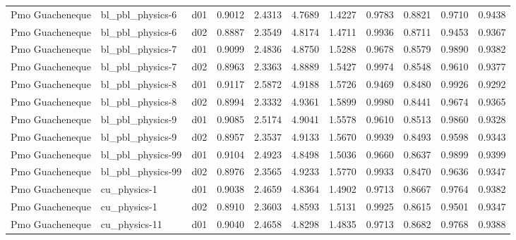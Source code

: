 \begin{longtable}{lllrrrrrrrr}
      Pmo Guacheneque  &      bl\_pbl\_physics-6 &     d01 &   0.9012 &   2.4313 &   4.7689 &       1.4227 &        0.9783 &       0.8821 &           0.9710 &  0.9438 \\
      Pmo Guacheneque  &      bl\_pbl\_physics-6 &     d02 &   0.8887 &   2.3549 &   4.8174 &       1.4711 &        0.9936 &       0.8711 &           0.9453 &  0.9367 \\
      Pmo Guacheneque  &      bl\_pbl\_physics-7 &     d01 &   0.9099 &   2.4836 &   4.8750 &       1.5288 &        0.9678 &       0.8579 &           0.9890 &  0.9382 \\
      Pmo Guacheneque  &      bl\_pbl\_physics-7 &     d02 &   0.8963 &   2.3363 &   4.8889 &       1.5427 &        0.9974 &       0.8548 &           0.9610 &  0.9377 \\
      Pmo Guacheneque  &      bl\_pbl\_physics-8 &     d01 &   0.9117 &   2.5872 &   4.9188 &       1.5726 &        0.9469 &       0.8480 &           0.9926 &  0.9292 \\
      Pmo Guacheneque  &      bl\_pbl\_physics-8 &     d02 &   0.8994 &   2.3332 &   4.9361 &       1.5899 &        0.9980 &       0.8441 &           0.9674 &  0.9365 \\
      Pmo Guacheneque  &      bl\_pbl\_physics-9 &     d01 &   0.9085 &   2.5174 &   4.9041 &       1.5578 &        0.9610 &       0.8513 &           0.9860 &  0.9328 \\
      Pmo Guacheneque  &      bl\_pbl\_physics-9 &     d02 &   0.8957 &   2.3537 &   4.9133 &       1.5670 &        0.9939 &       0.8493 &           0.9598 &  0.9343 \\
      Pmo Guacheneque  &     bl\_pbl\_physics-99 &     d01 &   0.9104 &   2.4923 &   4.8498 &       1.5036 &        0.9660 &       0.8637 &           0.9899 &  0.9399 \\
      Pmo Guacheneque  &     bl\_pbl\_physics-99 &     d02 &   0.8976 &   2.3565 &   4.9233 &       1.5770 &        0.9933 &       0.8470 &           0.9636 &  0.9347 \\
      Pmo Guacheneque  &          cu\_physics-1 &     d01 &   0.9038 &   2.4659 &   4.8364 &       1.4902 &        0.9713 &       0.8667 &           0.9764 &  0.9382 \\
      Pmo Guacheneque  &          cu\_physics-1 &     d02 &   0.8910 &   2.3603 &   4.8593 &       1.5131 &        0.9925 &       0.8615 &           0.9501 &  0.9347 \\
      Pmo Guacheneque  &         cu\_physics-11 &     d01 &   0.9040 &   2.4658 &   4.8298 &       1.4835 &        0.9713 &       0.8682 &           0.9768 &  0.9388 \\

\end{longtable}
